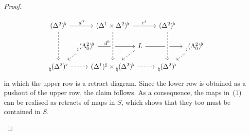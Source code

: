 \documentclass[reqno]{amsart}
\numberwithin{equation}{subsection}
\theoremstyle{plain}
\theoremstyle{definition}
\begin{document}
\begin{proof}
\begin{enumerate}
\begin{equation*}
\begin{tikzcd}[column sep={between origins,4em}, row sep={between origins,3em}]
	(\Delta^2)^\flat\arrow[rr, crossing over, "d^0"]\arrow[dd, dashed] && (\Delta^1\times\Delta^2)^\flat\arrow[rr, "r^\flat"] && (\Delta^2)^\flat &\\
	&\prescript{}{\natural}{(\Lambda^2_0)^\flat} \arrow[rr, "d^0", near start] \arrow[dl, dashed]&& L\arrow[rr]\arrow[dl, dashed] && \prescript{}{\natural}{(\Lambda^2_0)^\flat}\arrow[dl, dashed]\\
	\prescript{}{\natural}{(\Delta^2)^\flat}\arrow[rr, dashed]&& (\Delta^1)^\sharp\times \prescript{}{\natural}{(\Delta^2)^\flat}\arrow[rr, dashed] \arrow[from=uu, crossing over, dashed] && \prescript{}{\natural}{(\Delta^2)^\flat}\arrow[from=uu, crossing over, dashed] &
	\end{tikzcd}
	\end{equation*}
	in which the upper row is a retract diagram. Since the lower row is obtained as a pushout of the upper row, the claim follows. As a consequence, the maps in~(1) can be realised as retracts of maps in $S$, which shows that they too must be contained in $S$. 
	

\end{enumerate}
\end{proof}
\end{document}
